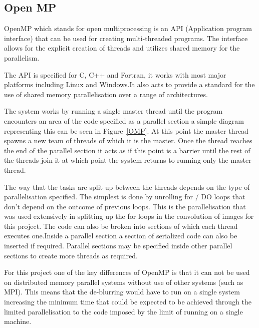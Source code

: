 \subsection{Open MP}
OpenMP which stands for open multiprocessing is an API (Application program interface) that can be used for creating multi-threaded programs. The interface allows for the explicit creation of threads and utilizes shared memory for the parallelism.

The API is specified for C, C++ and Fortran, it works with most major platforms including Linux and Windows.It also acts to provide a standard for the use of shared memory parallelisation over a range of architectures.

The system works by running a single master thread until the program encounters an area of the code specified as a parallel section a simple diagram representing this can be seen in Figure~\ref{OMP}. At this point the master thread spawns a new team of threads of which it is the master. Once the thread reaches the end of the parallel section it acts as if this point is a barrier until the rest of the threads join it at which point the system returns to running only the master thread. 

The way that the tasks are split up between the threads depends on the type of parallelisation specified. The simplest is done by unrolling for / DO loops that don’t depend on the outcome of previous loops. This is the parallelisation that was used extensively in splitting up the for loops in the convolution of images for this project. The code can also be broken into sections of which each thread executes one.Inside a parallel section a section of serialized code can also be inserted if required. Parallel sections may be specified inside other parallel sections to create more threads as required.

For this project one of the key differences of OpenMP is that it can not be used on distributed memory parallel systems without use of other systems (such as MPI). This means that the de-blurring would have to run on a single system increasing the minimum time that could be expected to be achieved through the limited parallelisation to the code imposed by the limit of running on a single machine.